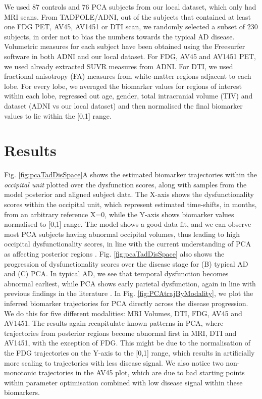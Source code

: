 \documentclass{llncs}
\begin{document}
We used 87 controls and 76 PCA subjects from our local dataset, which only had MRI scans. From TADPOLE/ADNI, out of the subjects that contained at least one FDG PET, AV45, AV1451 or DTI scan, we randomly selected a subset of 230 subjects, in order not to bias the numbers towards the typical AD disease.  Volumetric measures for each subject have been obtained using the Freesurfer software in both ADNI and our local dataset. For FDG, AV45 and AV1451 PET, we used already extracted SUVR measures from ADNI. For DTI, we used fractional anisotropy (FA) measures from white-matter regions adjacent to each lobe. For every lobe, we averaged the biomarker values for regions of interest within each lobe, regressed out age, gender, total intracranial volume (TIV) and dataset (ADNI vs our local dataset) and then normalised the final biomarker values to lie within the [0,1] range.

\section{Results}

Fig. \ref{fig:pcaTadDisSpace}A shows the estimated biomarker trajectories within the \emph{occipital unit} plotted over the dysfunction scores, along with samples from the model posterior and aligned subject data. The X-axis shows the dysfunctionality scores within the occipital unit, which represent estimated time-shifts, in months, from an arbitrary reference X=0, while the Y-axis shows biomarker values normalised to [0,1] range. The model shows a good data fit, and we can observe most PCA subjects having abnormal occipital volumes, thus leading to high occipital dysfunctionality scores, in line with the current understanding of PCA as affecting posterior regions \cite{crutch2012posterior}. Fig. \ref{fig:pcaTadDisSpace} also shows the progression of dysfunctionality scores over the disease stage for (B) typical AD and (C) PCA. In typical AD, we see that temporal dysfunction becomes abnormal earliest, while PCA shows early parietal dysfunction, again in line with previous findings in the literature \cite{crutch2012posterior,Baron2001}. In Fig. \ref{fig:PCAtrajByModality}, we plot the inferred biomarker trajectories for PCA directly across the disease progression. We do this for five different modalities: MRI Volumes, DTI, FDG, AV45 and AV1451. The results again recapitulate known patterns in PCA, where trajectories from posterior regions become abnormal first in MRI, DTI and AV1451, with the exception of FDG. This might be due to the normalisation of the FDG trajectories on the Y-axis to the [0,1] range, which results in artificially more scaling to trajectories with less disease signal. We also notice two non-monotonic trajectories in the AV45 plot, which are due to bad starting points within parameter optimisation combined with low disease signal within these biomarkers.
\end{document}
